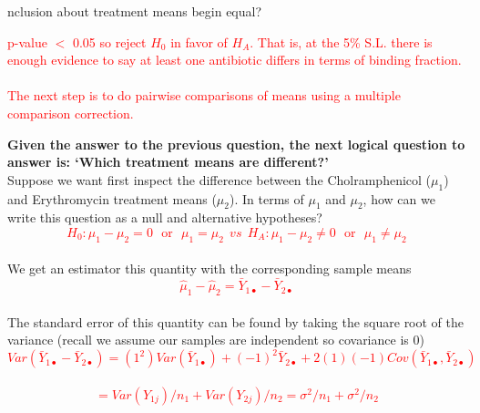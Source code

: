 nclusion about treatment means begin equal?%

\textcolor{red}{p-value $<$ 0.05 so reject $H_0$ in favor of $H_A$.  That is, at the 5\% S.L. there is enough evidence to say at least one antibiotic differs in terms of binding fraction.\\~\\
The next step is to do pairwise comparisons of means using a multiple comparison correction.}

\newpage

\Large\textbf{Given the answer to the previous question, the next logical question to answer is: `Which treatment means are different?'}\large \\

Suppose we want first inspect the difference between the Cholramphenicol ($\mu_{1}$) and Erythromycin treatment means ($\mu_{2}$).  In terms of $\mu_{1}$ and $\mu_{2}$, how can we write this question as a null and alternative hypotheses?%
\textcolor{red}{$$H_{0}: \mu_1-\mu_2=0~~~\mbox{or}~~~\mu_1=\mu_2~~vs~~H_{A}:\mu_1-\mu_2\neq 0~~~\mbox{or}~~~\mu_1\neq\mu_2$$}~\\

We get an estimator this quantity with the corresponding sample means%
\textcolor{red}{$$\hat{\mu}_{1}-\hat{\mu}_{2}=\bar{Y}_{1\bullet}-\bar{Y}_{2\bullet}$$}~\\

The standard error of this quantity can be found by taking the square root of the variance (recall we assume our samples are independent so covariance is 0)%
\textcolor{red}{$$Var(\bar{Y}_{1\bullet}-\bar{Y}_{2\bullet}) = (1^2)Var(\bar{Y}_{1\bullet})+(-1)^2\bar{Y}_{2\bullet}+2(1)(-1)Cov(\bar{Y}_{1\bullet},\bar{Y}_{2\bullet})$$~\\
$$=Var(Y_{1j})/n_1+Var(Y_{2j})/n_2 = \sigma^2/n_1+\sigma^2/n_2$$}~\\

